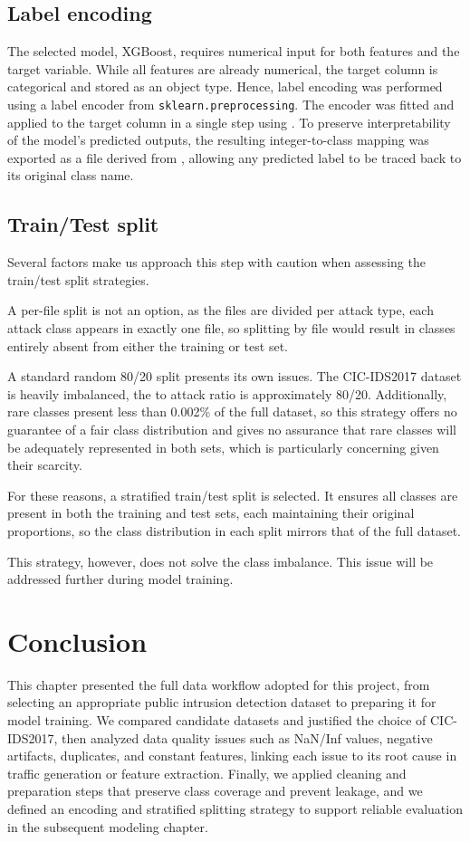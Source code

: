\subsection{Label encoding}
The selected model, XGBoost, requires numerical input for both features and the target variable. While all features are already numerical, the target column  is categorical and stored as an object type. Hence, label encoding was performed using a label encoder from \texttt{sklearn.preprocessing}. The encoder was fitted and applied to the target column in a single step using . To preserve interpretability of the model's predicted outputs, the resulting integer-to-class mapping was exported as a  file derived from , allowing any predicted label to be traced back to its original class name.

\subsection{Train/Test split}
Several factors make us approach this step with caution when assessing the train/test split strategies.

A per-file split is not an option, as the files are divided per attack type, each attack class appears in exactly one file, so splitting by file would result in classes entirely absent from either the training or test set.

A standard random 80/20 split presents its own issues. The CIC-IDS2017 dataset is heavily imbalanced, the  to attack ratio is approximately 80/20. Additionally, rare classes present less than 0.002\% of the full dataset, so this strategy offers no guarantee of a fair class distribution and gives no assurance that rare classes will be adequately represented in both sets, which is particularly concerning given their scarcity.

For these reasons, a stratified train/test split is selected. It ensures all classes are present in both the training and test sets, each maintaining their original proportions, so the class distribution in each split mirrors that of the full dataset.

This strategy, however, does not solve the class imbalance. This issue will be addressed further during model training.

\section{Conclusion}
This chapter presented the full data workflow adopted for this project, from selecting an appropriate public intrusion detection dataset to preparing it for model training. We compared candidate datasets and justified the choice of CIC-IDS2017, then analyzed data quality issues such as NaN/Inf values, negative artifacts, duplicates, and constant features, linking each issue to its root cause in traffic generation or feature extraction. Finally, we applied cleaning and preparation steps that preserve class coverage and prevent leakage, and we defined an encoding and stratified splitting strategy to support reliable evaluation in the subsequent modeling chapter.
